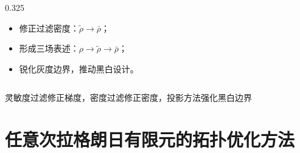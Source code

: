 \documentclass[notheorems]{beamer}
\begin{document}
\begin{frame}
\begin{columns}[T, totalwidth=\linewidth]
\begin{column}{0.325\linewidth}
\begin{tcolorbox}
{\begin{itemize}
							\item 修正过滤密度：$\tilde{\rho} \rightarrow \bar{\rho}$；
							
							\item 形成三场表述：$\rho \rightarrow \tilde{\rho} \rightarrow \bar{\rho}$；
							
							\item 锐化灰度边界，推动黑白设计。
						\end{itemize}
					}
				\end{tcolorbox}
			\end{column}
			
		\end{columns}
		
		\begin{tcolorbox}[
			colback=structure.fg,
			colframe=structure.fg,
			arc=3pt,
			boxrule=0pt,
			top=4pt, bottom=4pt, left=8pt, right=8pt]
			\centering
			{\fontsize{8.5}{12}\selectfont\sffamily\color{white}
				灵敏度过滤修正梯度，密度过滤修正密度，投影方法强化黑白边界}
		\end{tcolorbox}
		
	\end{frame}
	
	
	\section{任意次拉格朗日有限元的拓扑优化方法}
	
	
\end{document}
